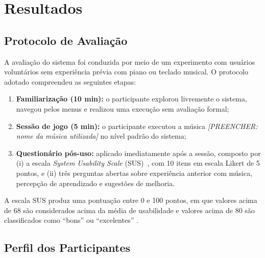 \documentclass[
  12pt,
  openright,
  twoside,
  a4paper,
  english,
  brazil
]{abntex2}
\begin{document}
\chapter{Resultados}
\label{cap:resultados}


\section{Protocolo de Avaliação}

A avaliação do sistema foi conduzida por meio de um experimento com
usuários voluntários sem experiência prévia com piano ou teclado
musical. O protocolo adotado compreendeu as seguintes etapas:

\begin{enumerate}
  \item \textbf{Familiarização (10 min):} o participante explorou
        livremente o sistema, navegou pelos menus e realizou uma
        execução sem avaliação formal;
  \item \textbf{Sessão de jogo (5 min):} o participante executou a
        música \textit{[PREENCHER: nome da música utilizada]} no nível
        padrão do sistema;
  \item \textbf{Questionário pós-uso:} aplicado imediatamente após a
        sessão, composto por (i) a escala \textit{System Usability
        Scale} (SUS)~\cite{brooke1996}, com 10 itens em escala Likert
        de 5 pontos, e (ii) três perguntas abertas sobre experiência
        anterior com música, percepção de aprendizado e sugestões de
        melhoria.
\end{enumerate}

A escala SUS produz uma pontuação entre 0 e 100 pontos, em que valores
acima de 68 são considerados acima da média de usabilidade e valores
acima de 80 são classificados como ``bons'' ou ``excelentes''
\cite{brooke1996}.

\section{Perfil dos Participantes}
\end{document}
